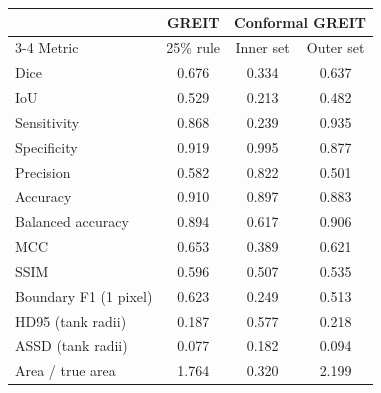 \begin{tabular}{lccc}
\toprule
 & GREIT & \multicolumn{2}{c}{Conformal GREIT}\\
\cmidrule(lr){3-4}
Metric & 25\% rule & Inner set & Outer set\\
\midrule
Dice & 0.676 & 0.334 & 0.637\\
IoU & 0.529 & 0.213 & 0.482\\
Sensitivity & 0.868 & 0.239 & 0.935\\
Specificity & 0.919 & 0.995 & 0.877\\
Precision & 0.582 & 0.822 & 0.501\\
Accuracy & 0.910 & 0.897 & 0.883\\
Balanced accuracy & 0.894 & 0.617 & 0.906\\
MCC & 0.653 & 0.389 & 0.621\\
SSIM & 0.596 & 0.507 & 0.535\\
Boundary F1 (1 pixel) & 0.623 & 0.249 & 0.513\\
HD95 (tank radii) & 0.187 & 0.577 & 0.218\\
ASSD (tank radii) & 0.077 & 0.182 & 0.094\\
Area / true area & 1.764 & 0.320 & 2.199\\
\bottomrule
\end{tabular}

